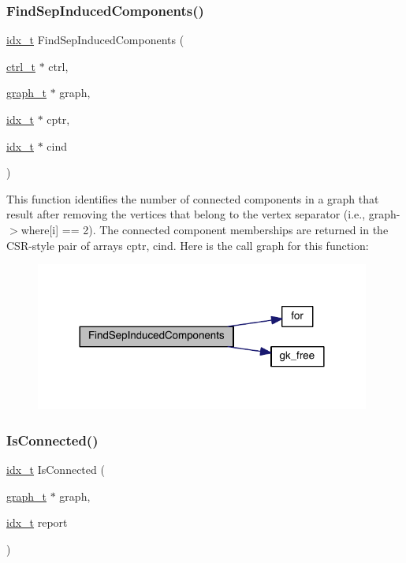 \subsubsection{\texorpdfstring{Find\+Sep\+Induced\+Components()}{FindSepInducedComponents()}}
{\footnotesize\ttfamily \hyperlink{a00876_aaa5262be3e700770163401acb0150f52}{idx\+\_\+t} Find\+Sep\+Induced\+Components (\begin{DoxyParamCaption}\item[{\hyperlink{a00742}{ctrl\+\_\+t} $\ast$}]{ctrl,  }\item[{\hyperlink{a00734}{graph\+\_\+t} $\ast$}]{graph,  }\item[{\hyperlink{a00876_aaa5262be3e700770163401acb0150f52}{idx\+\_\+t} $\ast$}]{cptr,  }\item[{\hyperlink{a00876_aaa5262be3e700770163401acb0150f52}{idx\+\_\+t} $\ast$}]{cind }\end{DoxyParamCaption})}

This function identifies the number of connected components in a graph that result after removing the vertices that belong to the vertex separator (i.\+e., graph-\/$>$where\mbox{[}i\mbox{]} == 2). The connected component memberships are returned in the C\+S\+R-\/style pair of arrays cptr, cind. Here is the call graph for this function\+:\nopagebreak
\begin{figure}[H]
\begin{center}
\leavevmode
\includegraphics[width=312pt]{a00188_a47a30c466b82022d1c12f2aac5653223_cgraph}
\end{center}
\end{figure}
\mbox{\label{a00188_a06638e74c8e49f9fb9881b960f8c4f05}} 
\subsubsection{\texorpdfstring{Is\+Connected()}{IsConnected()}}
{\footnotesize\ttfamily \hyperlink{a00876_aaa5262be3e700770163401acb0150f52}{idx\+\_\+t} Is\+Connected (\begin{DoxyParamCaption}\item[{\hyperlink{a00734}{graph\+\_\+t} $\ast$}]{graph,  }\item[{\hyperlink{a00876_aaa5262be3e700770163401acb0150f52}{idx\+\_\+t}}]{report }\end{DoxyParamCaption})}

